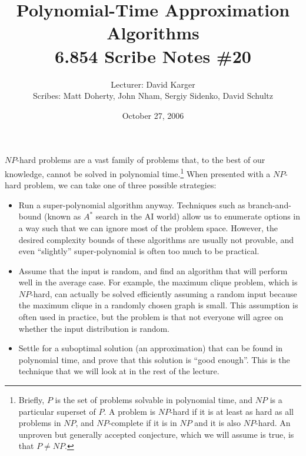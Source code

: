\documentclass{article}
\title{Polynomial-Time Approximation Algorithms\\ 6.854 Scribe Notes \#20}
\date{October 27, 2006}
\author{Lecturer: David Karger\\ Scribes: Matt Doherty, John Nham, Sergiy Sidenko, David Schultz}
\begin{document}
%
%
%
%

%



$NP$-hard problems are a vast family of problems that, to the best of
our knowledge, cannot be solved in polynomial time.\footnote{Briefly, $P$ is the set of problems solvable in
  polynomial time, and $NP$ is a particular superset of $P$.  A
  problem is $NP$-hard if it is at least as hard as all problems in
  $NP$, and $NP$-complete if it is in $NP$ and it is also $NP$-hard.
  An unproven but generally accepted conjecture, which we will assume
  is true, is that $P\ne NP$.}  When presented with a $NP$-hard problem, we can take one of three possible strategies:

\begin{itemize}
\item Run a super-polynomial algorithm anyway.  Techniques such as
branch-and-bound (known as $A^*$ search in the AI world) allow us to
enumerate options in a way such that we can ignore most of the problem
space.  However, the desired complexity bounds of these algorithms are
usually not provable, and even ``slightly'' super-polynomial
is often too much to be practical.
\item
Assume that the input is random, and find an algorithm that will perform well in the average case. For example, the maximum clique problem, which is $NP$-hard, can actually be solved efficiently assuming a random input because the maximum clique in a randomly chosen graph is small. This assumption is often used in practice, but the problem is that not everyone will agree on whether the input distribution is random.
\item Settle for a suboptimal solution (an approximation) that can be
found in polynomial time, and prove that this solution is ``good
enough''.  This is the technique that we will look at in the rest of
the lecture.
\end{itemize}
\end{document}
